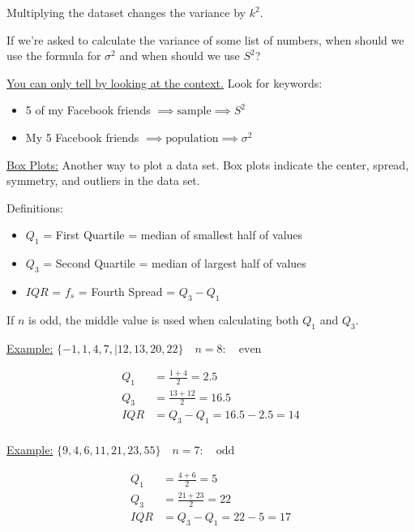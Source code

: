 \documentclass[../Notes.tex]{subfiles}
\begin{document}
    Multiplying the dataset changes the variance by $k^2$.

    If we're asked to calculate the variance of some list of numbers, when should we use the formula for $\sigma^2$ and when should we use $S^2$?

    \underline{You can only tell by looking at the context.} Look for keywords:

    \begin{itemize}
        \item 5 of my Facebook friends $\implies \text{sample} \implies S^2$
        \item My 5 Facebook friends $\implies \text{population} \implies \sigma^2$
    \end{itemize}

    \underline{Box Plots:} Another way to plot a data set. Box plots indicate the center, spread, symmetry, and outliers in the data set.

    Definitions:

    \begin{itemize}
        \item $Q_1$ = First Quartile = median of smallest half of values
        \item $Q_3$ = Second Quartile = median of largest half of values
        \item $IQR$ = $f_s$ = Fourth Spread = $Q_3-Q_1$
    \end{itemize}

    If $n$ is odd, the middle value is used when calculating both $Q_1$ and $Q_3$.

    \underline{Example:} $\{-1,1,4,7,\Big|12,13,20,22\} \quad n = 8: \quad \text{even}$

    \begin{align*}
        Q_1 & = \frac{1+4}{2} = 2.5   \\
        Q_3 & = \frac{13+12}{2} = 16.5\\
        IQR & = Q_3 - Q_1 = 16.5 - 2.5 = 14\\
    \end{align*}

    \underline{Example:} $\{9,4,6,11,21,23,55\} \quad n = 7: \quad \text{odd}$

    \begin{align*}
        Q_1 & = \frac{4+6}{2} = 5   \\
        Q_3 & = \frac{21+23}{2} = 22\\
        IQR & = Q_3 - Q_1 = 22 - 5 = 17\\
    \end{align*}
\end{document}
